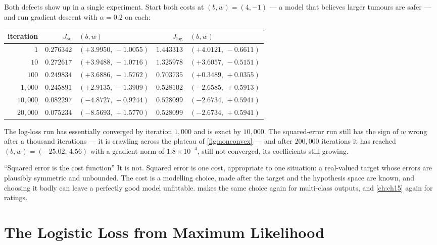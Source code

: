 Both defects show up in a single experiment. Start both costs at
$(b,w) = (4,-1)$ --- a model that believes larger tumours are safer --- and run
gradient descent with $\alpha = 0.2$ on each:

\begin{center}
\footnotesize
\renewcommand{\arraystretch}{1.2}
\begin{tabular}{@{}rrlrl@{}}
\toprule
iteration & $J_{\mathrm{sq}}$ & $(b,w)$ & $J_{\mathrm{log}}$ & $(b,w)$\\
\midrule
$1$      & $0.276342$ & $(+3.9950,\,-1.0055)$ & $1.443313$ & $(+4.0121,\,-0.6611)$\\
$10$     & $0.272617$ & $(+3.9488,\,-1.0716)$ & $1.325978$ & $(+3.6057,\,-0.5151)$\\
$100$    & $0.249834$ & $(+3.6886,\,-1.5762)$ & $0.703735$ & $(+0.3489,\,+0.0355)$\\
$1{,}000$  & $0.245891$ & $(+2.9135,\,-1.3909)$ & $0.528102$ & $(-2.6585,\,+0.5913)$\\
$10{,}000$ & $0.082297$ & $(-4.8727,\,+0.9244)$ & $0.528099$ & $(-2.6734,\,+0.5941)$\\
$20{,}000$ & $0.075234$ & $(-8.5693,\,+1.5770)$ & $0.528099$ & $(-2.6734,\,+0.5941)$\\
\bottomrule
\end{tabular}
\end{center}

The log-loss run has essentially converged by iteration $1{,}000$ and is exact
by $10{,}000$. The squared-error run still has the sign of $w$ wrong after a
thousand iterations --- it is crawling across the plateau of
\cref{fig:nonconvex} --- and after $200{,}000$ iterations it has reached
$(b,w) = (-25.02,\,4.56)$ with a gradient norm of $1.8\times 10^{-4}$, still not
converged, its coefficients still growing.

\begin{pitfall}{``Squared error is the cost function''}
It is not. Squared error is one cost, appropriate to one situation: a real-valued
target whose errors are plausibly symmetric and unbounded. The cost is a
modelling choice, made after the target and the hypothesis space are known, and
choosing it badly can leave a perfectly good model unfittable. 
makes the same choice again for multi-class outputs, and \cref{ch:ch15} again for
ratings.
\end{pitfall}

\section{The Logistic Loss from Maximum Likelihood}
\label{sec:logistic-loss}

